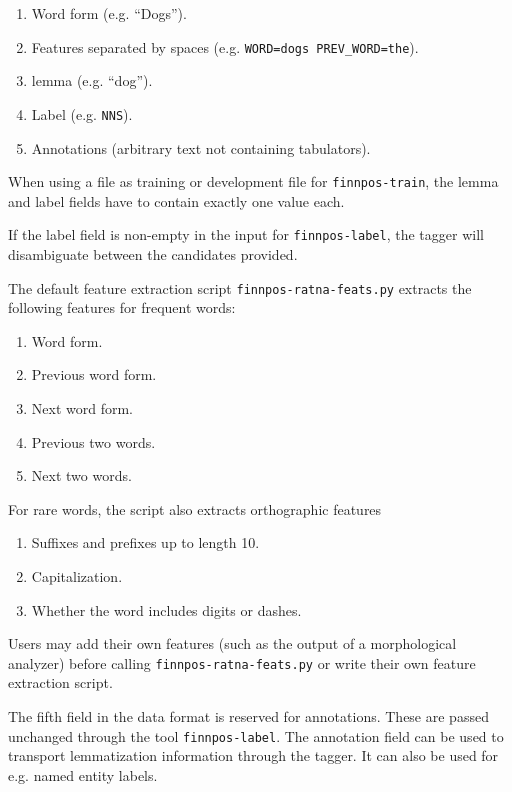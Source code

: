 \documentclass{llncs}
\begin{document}
\begin{enumerate}
  \item  Word form (e.g. ``Dogs'').
  \item  Features separated by spaces (e.g. \verb|WORD=dogs PREV_WORD=the|).
  \item  lemma (e.g. ``dog'').
  \item  Label (e.g. \verb|NNS|).
  \item  Annotations (arbitrary text not containing tabulators).
\end{enumerate}

When using a file as training or development file for {\tt finnpos-train}, the lemma and label fields have to contain exactly one value each.

If the label field is non-empty in the input for {\tt finnpos-label}, the tagger will disambiguate between the candidates provided.

The default feature extraction script {\tt finnpos-ratna-feats.py}
extracts the following features for frequent words:

\begin{enumerate}
\item Word form.
\item Previous word form.
\item Next word form.
\item Previous two words.
\item Next two words.
\end{enumerate}

For rare words, the script also extracts orthographic features

\begin{enumerate}
\item Suffixes and prefixes up to length 10.
\item Capitalization.
\item Whether the word includes digits or dashes.
\end{enumerate}

Users may add their own features (such as the output of a
morphological analyzer) before calling {\tt finnpos-ratna-feats.py} or
write their own feature extraction script.

The fifth field in the data format is reserved for annotations. These
are passed unchanged through the tool {\tt finnpos-label}. The
annotation field can be used to transport lemmatization information
through the tagger. It can also be used for e.g. named entity labels.
\end{document}

